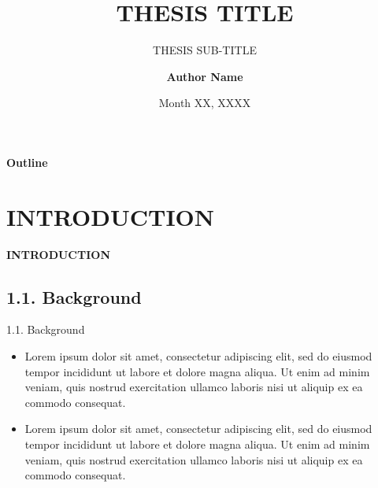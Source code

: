 \documentclass[11pt]{beamer}%
\begin{document}
	\author{\textbf{Author Name}\vspace{-25pt}}
	\title{\textbf{THESIS TITLE}}
	\subtitle{THESIS SUB-TITLE}
	\date{Month XX, XXXX}
	\begin{frame}[plain]
		\maketitle
	\end{frame}
	
	
	\begin{frame}{\textbf{Outline}}
	\tableofcontents[hideallsubsections]		
	\end{frame}

\section{INTRODUCTION}
\begin{frame}{}
	\begin{center} 
	\textbf{\huge INTRODUCTION}\vspace{-30pt} 
	\end{center}
\end{frame}

\subsection{1.1. Background}
\begin{frame}{1.1. Background}
	\begin{itemize}
		\item Lorem ipsum dolor sit amet, consectetur adipiscing elit, sed do eiusmod tempor incididunt ut labore et dolore magna aliqua. Ut enim ad minim veniam, quis nostrud exercitation ullamco laboris nisi ut aliquip ex ea commodo consequat.
		\item Lorem ipsum dolor sit amet, consectetur adipiscing elit, sed do eiusmod tempor incididunt ut labore et dolore magna aliqua. Ut enim ad minim veniam, quis nostrud exercitation ullamco laboris nisi ut aliquip ex ea commodo consequat.
	\end{itemize}
\end{frame}
\end{document}
